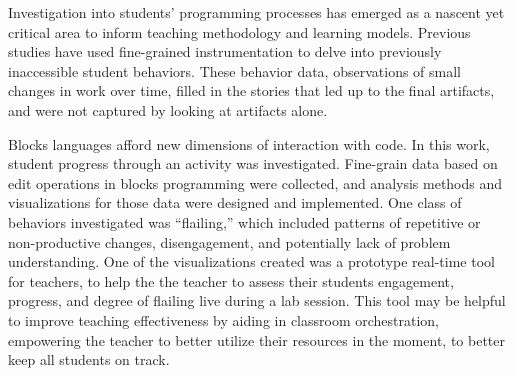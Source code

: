 % 
% 
%


Investigation into students' programming processes has emerged as a nascent yet critical area to inform teaching methodology and learning models. Previous studies have used fine-grained instrumentation to delve into previously inaccessible student behaviors. These behavior data, observations of small changes in work over time, filled in the stories that led up to the final artifacts, and were not captured by looking at artifacts alone. 

Blocks languages afford new dimensions of interaction with code. In this work, student progress through an activity was investigated. Fine-grain data based on edit operations in blocks programming were collected, and analysis methods and visualizations for those data were designed and implemented. One class of behaviors investigated was ``flailing,'' which included patterns of repetitive or non-productive changes, disengagement, and potentially lack of problem understanding. One of the visualizations created was a prototype real-time tool for teachers, to help the the teacher to assess their students engagement, progress, and degree of flailing live during a lab session. This tool may be helpful to improve teaching effectiveness by aiding in classroom orchestration, empowering the teacher to better utilize their resources in the moment, to better keep all students on track.

